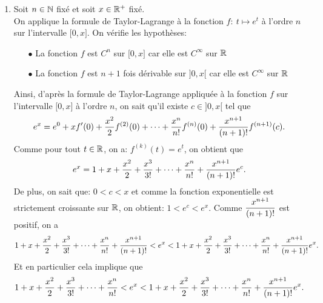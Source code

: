 \documentclass[a4paper, 11pt,reqno]{article}
\begin{document}
\begin{correction}
\begin{enumerate}
\begin{enumerate}
\begin{itemize}
				            \item[$\bullet$] La fonction $f$ est 4 fois d\'erivable sur $\rbrack 0,x\lbrack$ car elle est $C^{\infty}$ sur $\R$
			            \end{itemize}
			            Ainsi, d'apr\`es la formule de Taylor-Lagrange appliqu\'ee \`a la fonction $f$ sur l'intervalle $\lbrack 0,x\rbrack$ \`a l'ordre 3, on sait qu'il existe $c\in\rbrack 0,x\lbrack$ tel que
			            $$e^x=e^0+xf^{\prime}(0)+\ddp\frac{x^2}{2}f^{(2)}(0)+\ddp\frac{x^3}{3!}f^{(3)}(0)+\ddp\frac{x^4}{4!} f^{(4)}(c).$$
			            Comme pour tout $t\in\R$, on a: $f^{(k)}(t)=e^t$, on obtient que
			            $$e^x=1+x+\ddp\frac{x^2}{2}+\ddp\frac{x^3}{3!}+\ddp\frac{x^4}{4!}e^c.$$
		      \end{enumerate}
		\item Soit $n\in\mathbb{N}$ fix\'e et soit $x\in\mathbb{R}^+$ fix\'e.\\
		      \noindent
		      On applique la formule de Taylor-Lagrange \`a la fonction $f:\ t\mapsto e^t$ \`a l'ordre $n$ sur l'intervalle $\lbrack 0,x\rbrack$. On v\'erifie les hypoth\`eses:
		      \begin{itemize}
			      \item[$\bullet$] La fonction $f$ est $C^n$ sur $\lbrack 0,x\rbrack$ car elle est $C^{\infty}$ sur $\R$
			      \item[$\bullet$] La fonction $f$ est $n+1$ fois d\'erivable sur $\rbrack 0,x\lbrack$ car elle est $C^{\infty}$ sur $\R$
		      \end{itemize}
		      Ainsi, d'apr\`es la formule de Taylor-Lagrange appliqu\'ee \`a la fonction $f$ sur l'intervalle $\lbrack 0,x\rbrack$ \`a l'ordre $n$, on sait qu'il existe $c\in\rbrack 0,x\lbrack$ tel que
		      $$e^x=e^0+xf^{\prime}(0)+\displaystyle\frac{x^2}{2}f^{(2)}(0)+\dots+\displaystyle\frac{x^n}{n!} f^{(n)}(0)+\displaystyle\frac{x^{n+1}}{(n+1)!}f^{(n+1)}(c).$$
		      Comme pour tout $t\in\R$, on a: $f^{(k)}(t)=e^t$, on obtient que
		      $$e^x=1+x+\displaystyle\frac{x^2}{2}+\displaystyle\frac{x^3}{3!}+\dots+\displaystyle\frac{x^n}{n!}+\displaystyle\frac{x^{n+1}}{(n+1)!}e^c.$$
		      De plus, on sait que: $0<c<x$ et comme la fonction exponentielle est strictement croissante sur $\R$, on obtient: $1<e^c<e^x$. Comme $\displaystyle\frac{x^{n+1}}{(n+1)!}$ est positif, on a
		      $$1+x+\displaystyle\frac{x^2}{2}+\displaystyle\frac{x^3}{3!}+\dots+\displaystyle\frac{x^n}{n!}+\displaystyle\frac{x^{n+1}}{(n+1)!}<e^x<1+x+\displaystyle\frac{x^2}{2}+\displaystyle\frac{x^3}{3!}+\dots+\displaystyle\frac{x^n}{n!}+\displaystyle\frac{x^{n+1}}{(n+1)!}e^x.$$
		      Et en particulier cela implique que
		      $$1+x+\displaystyle\frac{x^2}{2}+\displaystyle\frac{x^3}{3!}+\dots+\displaystyle\frac{x^n}{n!}<e^x<1+x+\displaystyle\frac{x^2}{2}+\displaystyle\frac{x^3}{3!}+\dots+\displaystyle\frac{x^n}{n!}+\displaystyle\frac{x^{n+1}}{(n+1)!}e^x.$$

\end{enumerate}
\end{correction}
\end{document}
